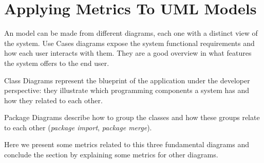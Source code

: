 \section{Applying Metrics To UML Models}\label{metrics}

An \umlS model can be made from different diagrams, each one with a distinct view of the system. Use Cases diagrams expose the system functional requirements and how each user interacts with them. They are a good overview in what features the system offers to the end user.

Class Diagrams represent the blueprint of the application under the developer perspective: they illustrate which programming components a system has and how they related to each other.

Package Diagrams describe how to group the classes and how these groups relate to each other (\textit{package import}, \textit{package merge}).


Here we present some metrics related to this three fundamental diagrams and conclude the section by explaining some metrics for other \umlS diagrams.


